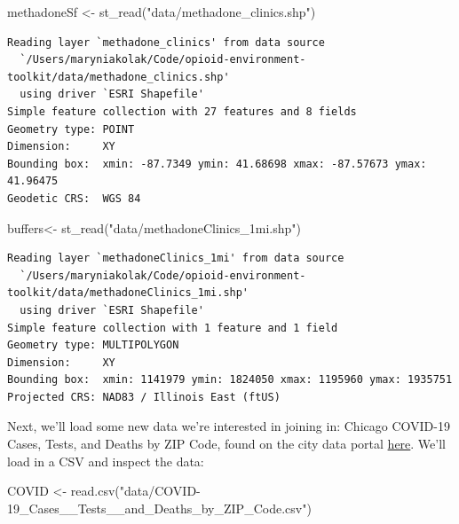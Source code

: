 \documentclass[
  letterpaper,
  DIV=11,
  numbers=noendperiod]{scrreprt}
\newenvironment{Shaded}{\begin{snugshade}}{\end{snugshade}}
\newcommand{\FunctionTok}[1]{\textcolor[rgb]{0.28,0.35,0.67}{#1}}
\newcommand{\NormalTok}[1]{\textcolor[rgb]{0.00,0.23,0.31}{#1}}
\newcommand{\OtherTok}[1]{\textcolor[rgb]{0.00,0.23,0.31}{#1}}
\newcommand{\StringTok}[1]{\textcolor[rgb]{0.13,0.47,0.30}{#1}}
\begin{document}
\begin{Shaded}
\begin{Highlighting}[]
\NormalTok{methadoneSf }\OtherTok{\textless{}{-}} \FunctionTok{st\_read}\NormalTok{(}\StringTok{"data/methadone\_clinics.shp"}\NormalTok{)}
\end{Highlighting}
\end{Shaded}

\begin{verbatim}
Reading layer `methadone_clinics' from data source 
  `/Users/maryniakolak/Code/opioid-environment-toolkit/data/methadone_clinics.shp' 
  using driver `ESRI Shapefile'
Simple feature collection with 27 features and 8 fields
Geometry type: POINT
Dimension:     XY
Bounding box:  xmin: -87.7349 ymin: 41.68698 xmax: -87.57673 ymax: 41.96475
Geodetic CRS:  WGS 84
\end{verbatim}

\begin{Shaded}
\begin{Highlighting}[]
\NormalTok{buffers}\OtherTok{\textless{}{-}} \FunctionTok{st\_read}\NormalTok{(}\StringTok{"data/methadoneClinics\_1mi.shp"}\NormalTok{)}
\end{Highlighting}
\end{Shaded}

\begin{verbatim}
Reading layer `methadoneClinics_1mi' from data source 
  `/Users/maryniakolak/Code/opioid-environment-toolkit/data/methadoneClinics_1mi.shp' 
  using driver `ESRI Shapefile'
Simple feature collection with 1 feature and 1 field
Geometry type: MULTIPOLYGON
Dimension:     XY
Bounding box:  xmin: 1141979 ymin: 1824050 xmax: 1195960 ymax: 1935751
Projected CRS: NAD83 / Illinois East (ftUS)
\end{verbatim}

Next, we'll load some new data we're interested in joining in: Chicago
COVID-19 Cases, Tests, and Deaths by ZIP Code, found on the city data
portal
\href{https://data.cityofchicago.org/Health-Human-Services/COVID-19-Cases-Tests-and-Deaths-by-ZIP-Code/yhhz-zm2v}{here}.
We'll load in a CSV and inspect the data:

\begin{Shaded}
\begin{Highlighting}[]
\NormalTok{COVID }\OtherTok{\textless{}{-}} \FunctionTok{read.csv}\NormalTok{(}\StringTok{"data/COVID{-}19\_Cases\_\_Tests\_\_and\_Deaths\_by\_ZIP\_Code.csv"}\NormalTok{)}
\end{Highlighting}
\end{Shaded}
\end{document}
